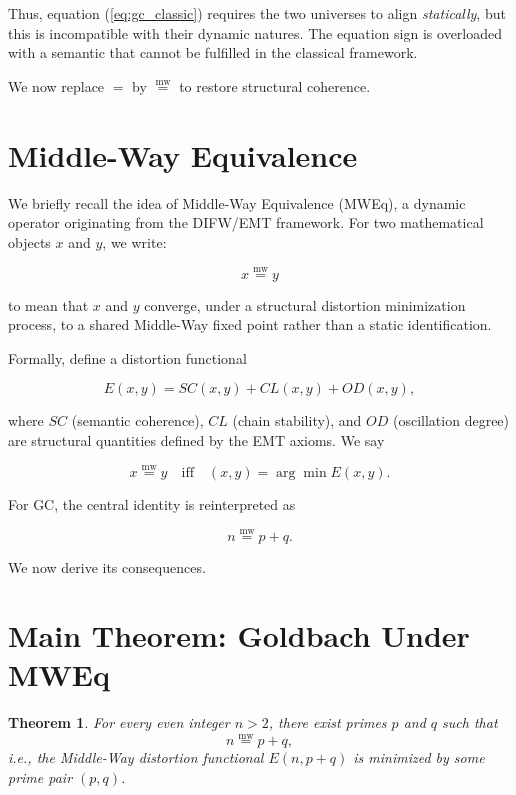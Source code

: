 \documentclass[12pt]{article}
\newcommand{\mweq}{\mathrel{\overset{\mathrm{mw}}{=}}}
\newtheorem{theorem}{Theorem}[section]
\theoremstyle{definition}
\theoremstyle{remark}
\begin{document}
Thus, equation (\ref{eq:gc_classic}) requires the two universes to
align \emph{statically}, but this is incompatible with their dynamic
natures. The equation sign is overloaded with a semantic that cannot
be fulfilled in the classical framework.

We now replace $=$ by $\mweq$ to restore structural coherence.

\section{Middle-Way Equivalence}

We briefly recall the idea of Middle-Way Equivalence (MWEq), a dynamic
operator originating from the DIFW/EMT framework. For two mathematical
objects $x$ and $y$, we write:

\[
x \mweq y
\]

to mean that $x$ and $y$ converge, under a structural distortion
minimization process, to a shared Middle-Way fixed point rather than
a static identification.

Formally, define a distortion functional

\[
E(x,y) = SC(x,y) + CL(x,y) + OD(x,y),
\]

where $SC$ (semantic coherence), $CL$ (chain stability), and $OD$
(oscillation degree) are structural quantities defined by the EMT
axioms. We say

\[
x \mweq y
\quad\text{iff}\quad
(x,y) = \arg\min E(x,y).
\]

For GC, the central identity is reinterpreted as

\begin{equation}
n \mweq p + q.
\end{equation}

We now derive its consequences.

\section{Main Theorem: Goldbach Under MWEq}

\begin{theorem}
For every even integer $n > 2$, there exist primes $p$ and $q$
such that
\[
n \mweq p + q,
\]
i.e., the Middle-Way distortion functional $E(n,p+q)$ is minimized
by some prime pair $(p,q)$.
\end{theorem}
\end{document}
